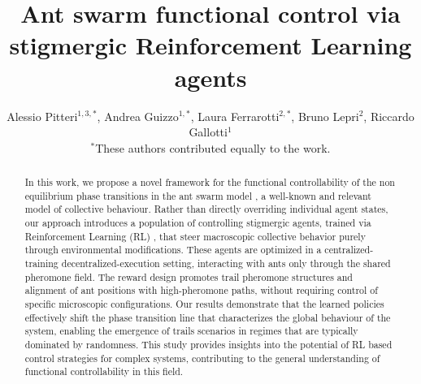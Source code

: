 \documentclass[openacc]{rsproca_new}
\begin{document}
\title{Ant swarm functional control via stigmergic Reinforcement Learning agents}
\author{
Alessio Pitteri$^{1,3,*}$,
Andrea Guizzo$^{1,*}$,
Laura Ferrarotti$^{2,*}$,
Bruno Lepri$^{2}$,
Riccardo Gallotti$^{1}$\\[0.5em]
\small $^{*}$These authors contributed equally to the work.
}

\address{$^{1}$MobS Lab, Fondazione Bruno Kessler, Via Sommarive, 18, Trento, 38123, Italy\\
$^{2}$CHuB Lab, Fondazione Bruno Kessler, Via Sommarive, 18, Trento, 38123, Italy\\
$^{3}$City Science Lab, Alma Mater Studiorum Università di Bologna, Viale Carlo Berti Pichat, 6/2, Bologna, 40127, Italy }

\subject{xxxxx, xxxxx, xxxx}






\begin{abstract}
In this work, we propose a novel framework for the functional controllability of the non equilibrium phase transitions in the ant swarm model \cite{chialvoswarms,patternformation,SwarmPhaseTrans}, a well-known and relevant model of collective behaviour. Rather than directly overriding individual agent states, our approach introduces a population of controlling stigmergic agents, trained via Reinforcement Learning (RL) \cite{suttonbarto}, that steer macroscopic collective behavior purely through environmental modifications. These agents are optimized %
in a centralized-training decentralized-execution setting, interacting with ants only through the shared pheromone field. The reward design promotes trail pheromone structures and alignment of ant positions with high-pheromone paths, without requiring control of specific microscopic configurations. Our results demonstrate that the learned policies effectively shift the phase transition line that characterizes the global behaviour of the system, enabling the emergence of trails scenarios in regimes that are typically dominated by randomness. This study provides insights into the potential of RL based control strategies for complex systems, contributing %
to the general understanding of functional controllability in this field. %
\end{abstract}
\end{document}

